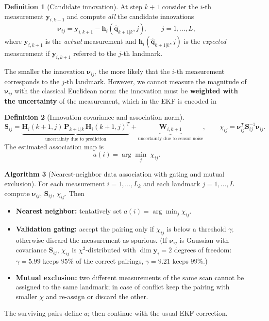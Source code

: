 \documentclass[11pt,a4paper]{article}
\theoremstyle{definition}
\newtheorem{definition}{Definition}[section]
\newtheorem{algorithm}[definition]{Algorithm}
\theoremstyle{plain}
\theoremstyle{remark}
\newcommand{\hq}{\hat{\bm q}}
\begin{document}
\begin{definition}[Candidate innovation]
At step $k+1$ consider the $i$-th measurement $\bm y_{i,k+1}$ and compute \emph{all} the candidate innovations
\[
\bm\nu_{ij}=\bm y_{i,k+1}-\bm h_i(\hq_{k+1|k},j),\qquad j=1,\dots,L,
\]
where $\bm y_{i,k+1}$ is the \emph{actual} measurement and $\bm h_i(\hq_{k+1|k},j)$ is the \emph{expected} measurement if $\bm y_{i,k+1}$ referred to the $j$-th landmark.
\end{definition}

The smaller the innovation $\bm\nu_{ij}$, the more likely that the $i$-th measurement corresponds to the $j$-th landmark. However, we cannot measure the magnitude of $\bm\nu_{ij}$ with the classical Euclidean norm: the innovation must be \textbf{weighted with the uncertainty} of the measurement, which in the EKF is encoded in
\begin{definition}[Innovation covariance and association norm]
\[
\bm S_{ij}=\underbrace{\bm H_i(k+1,j)\,\bm P_{k+1|k}\,\bm H_i(k+1,j)^T}_{\text{uncertainty due to prediction}}+\underbrace{\bm W_{i,k+1}}_{\text{uncertainty due to sensor noise}},
\qquad
\chi_{ij}=\bm\nu_{ij}^T\bm S_{ij}^{-1}\bm\nu_{ij}.
\]
The estimated association map is
\[
a(i)=\arg\min_{j}\;\chi_{ij}.
\]
\end{definition}

\begin{algorithm}[Nearest-neighbor data association with gating and mutual exclusion]
For each measurement $i=1,\dots,L_k$ and each landmark $j=1,\dots,L$ compute $\bm\nu_{ij}$, $\bm S_{ij}$, $\chi_{ij}$. Then
\begin{itemize}
  \item \textbf{Nearest neighbor:} tentatively set $a(i)=\arg\min_j\chi_{ij}$.
  \item \textbf{Validation gating:} accept the pairing only if $\chi_{ij}$ is below a threshold $\gamma$; otherwise discard the measurement as spurious. (If $\bm\nu_{ij}$ is Gaussian with covariance $\bm S_{ij}$, $\chi_{ij}$ is $\chi^2$-distributed with $\dim\bm y_i=2$ degrees of freedom: $\gamma=5.99$ keeps $95\%$ of the correct pairings, $\gamma=9.21$ keeps $99\%$.)
  \item \textbf{Mutual exclusion:} two different measurements of the same scan cannot be assigned to the same landmark; in case of conflict keep the pairing with smaller $\chi$ and re-assign or discard the other.
\end{itemize}
The surviving pairs define $a$; then continue with the usual EKF correction.
\end{algorithm}
\end{document}
